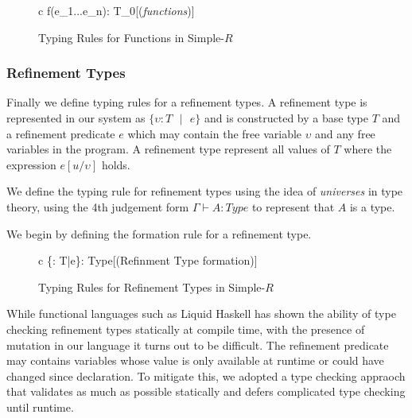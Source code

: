 \documentclass[a4paper,12pt]{report}
\begin{document}
\begin{figure}[H]
  \begin{center}
    \begin{tabular} {c}
        {\Gamma \vdash f(e_1...e_n): T_0}[(\textit{functions})]
    \end{tabular}
  \end{center}
  \caption{Typing Rules for Functions in Simple-$R$}
\end{figure}

\subsubsection{Refinement Types}
Finally we define typing rules for a refinement types. A refinement type 
is represented in our system as $\{\upsilon : T\text{ }|\text{ }e\}$ and is 
constructed by a base type $T$ and a refinement predicate $e$ which may contain 
the free variable $\upsilon$ and any free variables in the program. A refinement 
type represent all values of $T$ where the expression $e[u/\upsilon]$ holds. 

\par
We define the typing rule for refinement types using the idea of 
\textit{universes} \cite{martinLof} in type theory, using the 4th judgement form 
$\Gamma \vdash A : Type$ to represent that $A$ is a type. 

\par
We begin by defining the formation rule for a refinement type. 
\begin{figure}[H]
  \begin{center}
    \begin{tabular} {c}
        {\Gamma \vdash \{\upsilon : T\text{ }|\text{ }e\}: Type}[(Refinment Type formation)]
    \end{tabular}
  \end{center}
  \caption{Typing Rules for Refinement Types in Simple-$R$}
\end{figure}


\par
While functional languages such as Liquid Haskell has shown the ability of type 
checking refinement types statically at compile time, with the presence of 
mutation in our language it turns out to be difficult. The refinement predicate 
may contains variables whose value is only available at runtime or could have 
changed since declaration. To mitigate this, we adopted a type checking appraoch 
that validates as much as possible statically and defers complicated type 
checking until runtime. 
\end{document}
